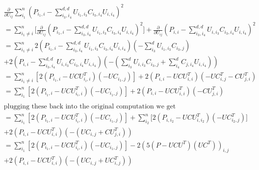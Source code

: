 \documentclass{report}
\begin{document}
   		 \begin{align*}
   		 &\frac{\partial}{\partial U_{ij}}\sum_{i_1}^n
   		 (P_{i_1,i} - \sum_{i_3,i_4}^{d,d}U_{i_1,i_3}C_{i_3,i_4}U_{i,i_4})^2\\
   		 &= \sum_{i_1 \neq i}^n
   		 \big[
   		   \frac{\partial}{\partial U_{ij}}
   		   (P_{i_1,i} - \sum_{i_3,i_4}^{d,d}U_{i_1,i_3}C_{i_3,i_4}U_{i,i_4})^2
   		 \big]
   		 + \frac{\partial}{\partial U_{ij}}(P_{i,i} - \sum_{i_3,i_4}^{d,d}U_{i,i_3}C_{i_3,i_4}U_{i,i_4})^2\\
   		 &= \sum_{i_1 \neq i}^n
   		 2(P_{i_1,i} - \sum_{i_3,i_4}^{d,d}U_{i_1,i_3}C_{i_3,i_4}U_{i,i_4})	 
   		 (-\sum_{i_3}^{d}U_{i_1,i_3}C_{i_3,j})\\
   		 &+ 2(P_{i,i} - \sum_{i_3,i_4}^{d,d}U_{i,i_3}C_{i_3,i_4}U_{i,i_4})
   		 (-(\sum_{i_3}^{d}U_{i,i_3}C_{i_3,j} +\sum_{i_4}^{d}C_{j,i_4}U_{i,i_4}))\\
   		 &= \sum_{i_1 \neq i}^n
   		 [2(P_{i_1,i} - UCU^T_{i_i,i})(-UC_{i_1,j})]
   		 + 2(P_{i,i} - UCU^T_{i,i})
   		 (-UC^T_{i,j}-CU^T_{j,i})\\
   		 &= \sum_{i_1}^n
   		 [2(P_{i_1,i} - UCU^T_{i_i,i})(-UC_{i_1,j})]
   		 + 2(P_{i,i} - UCU^T_{i,i})
   		 (-CU^T_{j,i})\\
   		 \end{align*}
   		 \begin{align*}
   		 &\text{plugging these back into the original computation we get}\\
   		 &= \sum_{i_1}^n
   		 [2(P_{i_1,i} - UCU^T_{i_i,i})(-UC_{i_1,j})]
   		 +\sum_{i_2}^n
   		 \big[
   		 2(P_{i,i_2} - UCU^T_{i,i_2})(-UC^T_{i_2,j})
   		 \big]\\
   		 &+ 2(P_{i,i} - UCU^T_{i,i})
   		 (-(UC_{i,j} + CU^T_{j,i}))\\
   		 &= \sum_{i_1}^n
   		 [2(P_{i_1,i} - UCU^T_{i_i,i})(-UC_{i_1,j})]
   		 -2(5(P - UCU^T)(UC^T))_{i,j}\\
   		 &+ 2(P_{i,i} - UCU^T_{i,i})
   		 (-(UC_{i,j} + UC^T_{i,j}))
   		 \end{align*}
   		 \newpage
\end{document}
